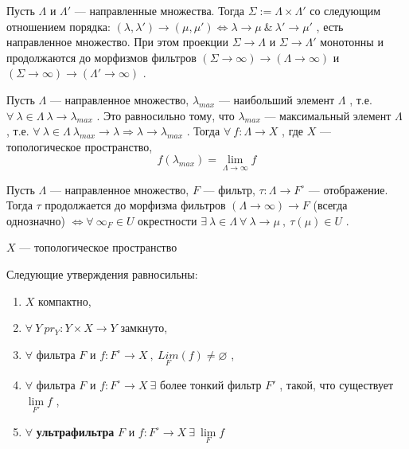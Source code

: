 \SSsect Пусть \( \Lambda \) и \( \Lambda' \) --- направленные множества. Тогда \( \Sigma := \Lambda \times \Lambda' \) со следующим отношением порядка: \( (\lambda,\lambda') \rightarrow (\mu,\mu') \Leftrightarrow \lambda \rightarrow \mu ~\&~  \lambda' \rightarrow \mu' \) , есть направленное множество. При этом проекции \( \Sigma \rightarrow \Lambda \) и \( \Sigma \rightarrow \Lambda' \) монотонны и продолжаются до морфизмов фильтров \( (\Sigma \rightarrow \infty) \rightarrow (\Lambda \rightarrow \infty) \) и \( (\Sigma \rightarrow \infty) \rightarrow (\Lambda' \rightarrow \infty) \) .

\SSsect Пусть \( \Lambda \) --- направленное множество, \( \lambda_{max} \) --- наибольший элемент \( \Lambda \) , т.е. \( \forall~\lambda \in \Lambda~ \lambda \rightarrow \lambda_{max} \) . Это равносильно тому, что \( \lambda_{max} \) --- максимальный элемент \( \Lambda \) , т.е. \( \forall~\lambda \in \Lambda~ \lambda_{max} \rightarrow \lambda \Rightarrow \lambda \rightarrow \lambda_{max} \) .
Тогда \( \forall~ f:\Lambda \rightarrow X \) , где \( X \) --- топологическое пространство,
\[ f(\lambda_{max}) = \lim\limits_{\Lambda \rightarrow \infty} f \]

\SSsect Пусть \( \Lambda \) --- направленное множество, \( F \) --- фильтр, \( \tau:\Lambda \rightarrow F^{\circ} \) --- отображение. Тогда \( \tau \) продолжается до морфизма фильтров \( (\Lambda \rightarrow \infty) \rightarrow F \) (всегда однозначно) \( \Leftrightarrow \forall~ \infty_F \in U \) окрестности \( \exists~\lambda \in \Lambda ~\forall~\lambda \rightarrow \mu ~,~ \tau(\mu) \in U \) .

\pagebreak

\SSbullet 
\begin{center}
    \( X \) --- топологическое пространство
\end{center}

\SSsect Следующие утверждения равносильны:
\begin{enumerate}[label={\alph*)}]
\item \( X \) компактно,
\item \( \forall~ Y ~ pr_Y: Y \times X \rightarrow Y \) замкнуто,
\item \( \forall \) фильтра \( F \) и \( f:F^{\circ} \rightarrow X ~,~ \underset{F}{Lim}(f) \neq \varnothing \) ,
\item \( \forall \) фильтра \( F \) и \( f:F^{\circ} \rightarrow X ~\exists \) более тонкий фильтр \( F' \) , такой, что существует \( \lim\limits_{F'} f \) ,
\item \( \forall \) \textbf{ультрафильтра} \( F \) и \( f:F^{\circ} \rightarrow X ~\exists~ \lim\limits_{F} f \)
\end{enumerate}

